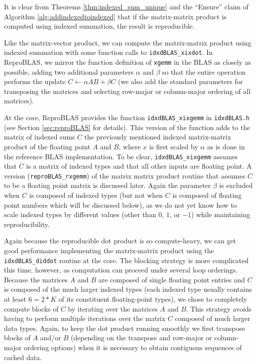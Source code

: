   It is clear from Theorems \ref{thm:indexed_sum_unique} and the ``Ensure'' claim of Algorithm \ref{alg:addindexedtoindexed} that if the matrix-matrix product is computed using indexed summation, the result is reproducible.

  Like the matrix-vector product, we can compute the matrix-matrix product using indexed summation with some function calls to \texttt{idxdBLAS\_xixdot}. In ReproBLAS, we mirror the function definition of \texttt{xgemm} in the BLAS as closely as possible, adding two additional parameters $\alpha$ and $\beta$ so that the entire operation performs the update $C \gets \alpha AB + \beta C$ (we also add the standard parameters for transposing the matrices and selecting row-major or column-major ordering of all matrices).

  At the core, ReproBLAS provides the function \texttt{idxdBLAS\_xixgemm} in \texttt{idxdBLAS.h} (see Section \ref{sec:reproBLAS} for details). This version of the function adds to the matrix of indexed sums $C$ the previously mentioned indexed matrix-matrix product of the floating point $A$ and $B$, where $x$ is first scaled by $\alpha$ as is done in the reference BLAS implementation. 
To be clear, \texttt{idxdBLAS\_xixgemm} assumes that $C$ is a matrix of indexed types and that all other inputs are floating point. A version (\texttt{reproBLAS\_rxgemm}) of the matrix matrix product routine that assumes $C$ to be a floating point matrix is discussed later. 
Again the parameter $\beta$ is excluded when $C$ is composed of indexed types (but not when $C$ is composed of floating point numbers which will be discussed below), as we do not yet know how to scale indexed types by different values (other than $0$, $1$, or $-1$) while maintaining reproducibility.

  Again because the reproducible dot product is so compute-heavy, we can get good performance implementing the matrix-matrix product using the \texttt{idxdBLAS\_diddot} routine at the core. The blocking strategy is more complicated this time, however, as computation can proceed under several loop orderings. Because the matrices $A$ and $B$ are composed of single floating point entries and $C$ is composed of the much larger indexed types (each indexed type usually contains at least $6 = 2 * K$ of its constituent floating-point types), we chose to completely compute blocks of $C$ by iterating over the matrices $A$ and $B$. This strategy avoids having to perform multiple iterations over the matrix $C$ composed of much larger data types. 
  Again, to keep the dot product running smoothly we first transpose blocks of $A$ and/or $B$ (depending on the transpose and row-major or column-major ordering options) when it is necessary to obtain contiguous sequences of cached data.

